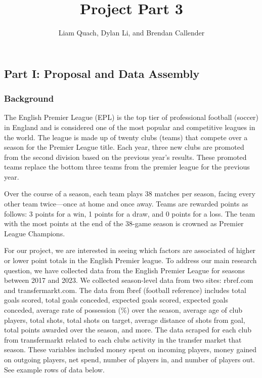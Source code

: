 \documentclass[
  letterpaper,
  DIV=11,
  numbers=noendperiod]{scrartcl}
\title{Project Part 3}
\author{Liam Quach, Dylan Li, and Brendan Callender}
\date{}
\begin{document}
\maketitle


\subsection{Part I: Proposal and Data
Assembly}\label{part-i-proposal-and-data-assembly}

\subsubsection{Background}\label{background}

The English Premier League (EPL) is the top tier of professional
football (soccer) in England and is considered one of the most popular
and competitive leagues in the world. The league is made up of twenty
clubs (teams) that compete over a season for the Premier League title.
Each year, three new clubs are promoted from the second division based
on the previous year's results. These promoted teams replace the bottom
three teams from the premier league for the previous year.

Over the course of a season, each team plays 38 matches per season,
facing every other team twice---once at home and once away. Teams are
rewarded points as follows: 3 points for a win, 1 points for a draw, and
0 points for a loss. The team with the most points at the end of the
38-game season is crowned as Premier League Champions.

For our project, we are interested in seeing which factors are
associated of higher or lower point totals in the English Premier
league. To address our main research question, we have collected data
from the English Premier League for seasons between 2017 and 2023. We
collected season-level data from two sites: rbref.com and
transfermarkt.com. The data from fbref (football reference) includes
total goals scored, total goals conceded, expected goals scored,
expected goals conceded, average rate of possession (\%) over the
season, average age of club players, total shots, total shots on target,
average distance of shots from goal, total points awarded over the
season, and more. The data scraped for each club from transfermarkt
related to each clubs activity in the transfer market that season. These
variables included money spent on incoming players, money gained on
outgoing players, net spend, number of players in, and number of players
out. See example rows of data below.
\end{document}
